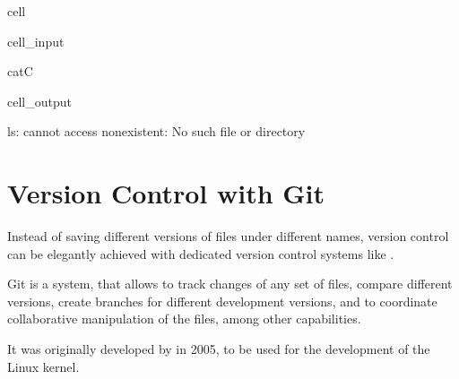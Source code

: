 \documentclass[a4paper,10pt,english]{jupyterBook}
\begin{document}
\begin{sphinxuseclass}{cell}\begin{sphinxVerbatimInput}

\begin{sphinxuseclass}{cell_input}
\begin{sphinxVerbatim}[commandchars=\\\{\}]
catC
\end{sphinxVerbatim}

\end{sphinxuseclass}\end{sphinxVerbatimInput}
\begin{sphinxVerbatimOutput}

\begin{sphinxuseclass}{cell_output}
\begin{sphinxVerbatim}[commandchars=\\\{\}]
ls: cannot access \PYGZsq{}nonexistent\PYGZsq{}: No such file or directory
\end{sphinxVerbatim}

\end{sphinxuseclass}\end{sphinxVerbatimOutput}

\end{sphinxuseclass}
\sphinxstepscope


\chapter{Version Control with Git}
\label{\detokenize{text/progtut/versioncontrol:version-control-with-git}}\label{\detokenize{text/progtut/versioncontrol::doc}}
\sphinxAtStartPar
Instead of saving different versions of files under different names, version control can be elegantly achieved with dedicated version control systems like .

\sphinxAtStartPar
Git is a  system, that allows to track changes of any set of files, compare different versions, create branches for different development versions, and to coordinate collaborative manipulation of the files, among other capabilities.

\sphinxAtStartPar
It was originally developed by  in 2005, to be used for the development of the Linux kernel.
\end{document}
